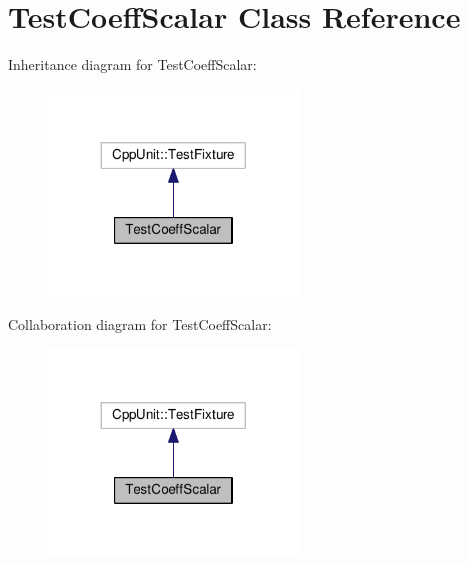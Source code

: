 \hypertarget{class_test_coeff_scalar}{}\section{Test\+Coeff\+Scalar Class Reference}
\label{class_test_coeff_scalar}


Inheritance diagram for Test\+Coeff\+Scalar\+:
\nopagebreak
\begin{figure}[H]
\begin{center}
\leavevmode
\includegraphics[width=188pt]{class_test_coeff_scalar__inherit__graph}
\end{center}
\end{figure}


Collaboration diagram for Test\+Coeff\+Scalar\+:
\nopagebreak
\begin{figure}[H]
\begin{center}
\leavevmode
\includegraphics[width=188pt]{class_test_coeff_scalar__coll__graph}
\end{center}
\end{figure}
